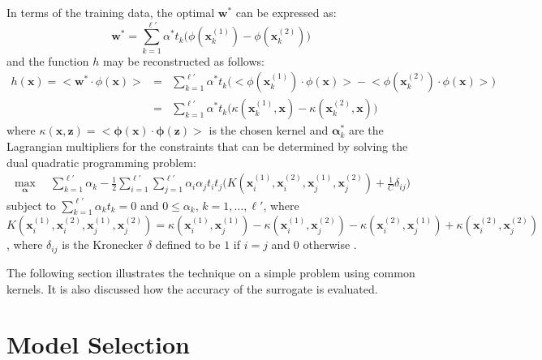 \documentclass[10pt]{llncs}
\renewcommand{\vec}[1]{{\mbox{\boldmath$#1$}}}
\newcommand{\inner}[2]{\big<\vec{#1}\cdot\vec{#2}\big>}
\renewcommand{\vec}[1]{{\mathbf #1}}
\begin{document}
In terms of the training data, the optimal $\vec{w}^*$ can be
expressed as:
\begin{equation}
\vec{w}^* = \sum_{k=1}^{\ell'}\alpha^*t_k\big(\phi(\vec{x}_k^{(1)})-\phi(\vec{x}_k^{(2)})\big)
\end{equation}
and the function $h$ may be reconstructed as follows:
\begin{eqnarray}
h(\vec{x}) = \big<\vec{w}^*\cdot\phi(\vec{x})\big> & = &
\sum_{k=1}^{\ell'}\alpha^*t_k\big(\big<\phi(\vec{x}_k^{(1)})\cdot\phi(\vec{x})\big>-\big<\phi(\vec{x}_k^{(2)})\cdot\phi(\vec{x})\big>\big)\nonumber\\
& = & \sum_{k=1}^{\ell'}\alpha^*t_k\big(\kappa(\vec{x}_k^{(1)},\vec{x})-\kappa(\vec{x}_k^{(2)},\vec{x})\big)
\end{eqnarray}
where $\kappa(\vec{x},\vec{z}) =
\inner{\phi(\vec{x})}{\phi(\vec{z})}$ is the chosen kernel and
$\vec{\alpha}^*_k$ are the Lagrangian multipliers for the
constraints that can be determined by solving the dual quadratic
programming problem:
{
\begin{eqnarray}
 \max_{\vec{\alpha}} \quad
\sum_{k=1}^{\ell'}\alpha_k-\tfrac{1}{2}\sum_{i=1}^{\ell'}\sum_{j=1}^{\ell'}\alpha_i\alpha_jt_it_j\big( K(\vec{x}_i^{(1)},\vec{x}_i^{(2)},\vec{x}_j^{(1)},\vec{x}_j^{(2)})+\tfrac{1}{C}\delta_{ij}\big)
\end{eqnarray}}
subject to $\sum_{k=1}^{\ell'}\alpha_kt_k=0$ and $0\le \alpha_k$, $k =
1,\ldots,\ell'$, where
$K(\vec{x}_i^{(1)},\vec{x}_i^{(2)},\vec{x}_j^{(1)},\vec{x}_j^{(2)}) =
\kappa(\vec{x}_i^{(1)},\vec{x}_j^{(1)})-\kappa(\vec{x}_i^{(1)},\vec{x}_j^{(2)})-\kappa(\vec{x}_i^{(2)},\vec{x}_j^{(1)})+\kappa(\vec{x}_i^{(2)},\vec{x}_j^{(2)})$,
where $\delta_{ij}$ is the Kronecker $\delta$ defined to be $1$ if
$i=j$ and $0$ otherwise \cite{CS02:book}. 

The following section illustrates the technique on a simple
problem using common kernels. It is also discussed how the
accuracy of the surrogate is evaluated.

\section{Model Selection}\label{sec:MS}
\end{document}

